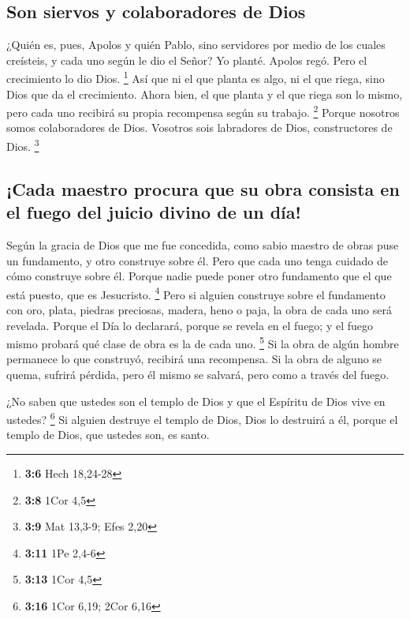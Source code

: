 \begin{paracol}{2}
\hypertarget{son-siervos-y-colaboradores-de-dios}{%
\subsection{Son siervos y colaboradores de
Dios}\label{son-siervos-y-colaboradores-de-dios}}

 ¿Quién es, pues, Apolos y quién Pablo, sino servidores
por medio de los cuales creísteis, y cada uno según le dio el Señor?
 Yo planté. Apolos regó. Pero el crecimiento lo dio Dios.
\footnote{\textbf{3:6} Hech 18,24-28}  Así que ni el que
planta es algo, ni el que riega, sino Dios que da el crecimiento.
 Ahora bien, el que planta y el que riega son lo mismo,
pero cada uno recibirá su propia recompensa según su trabajo.
\footnote{\textbf{3:8} 1Cor 4,5}  Porque nosotros somos
colaboradores de Dios. Vosotros sois labradores de Dios, constructores
de Dios. \footnote{\textbf{3:9} Mat 13,3-9; Efes 2,20}

\hypertarget{cada-maestro-procura-que-su-obra-consista-en-el-fuego-del-juicio-divino-de-un-duxeda}{%
\subsection{¡Cada maestro procura que su obra consista en el fuego del
juicio divino de un
día!}\label{cada-maestro-procura-que-su-obra-consista-en-el-fuego-del-juicio-divino-de-un-duxeda}}

 Según la gracia de Dios que me fue concedida, como sabio
maestro de obras puse un fundamento, y otro construye sobre él. Pero que
cada uno tenga cuidado de cómo construye sobre él. 
Porque nadie puede poner otro fundamento que el que está puesto, que es
Jesucristo. \footnote{\textbf{3:11} 1Pe 2,4-6}  Pero si
alguien construye sobre el fundamento con oro, plata, piedras preciosas,
madera, heno o paja,  la obra de cada uno será revelada.
Porque el Día lo declarará, porque se revela en el fuego; y el fuego
mismo probará qué clase de obra es la de cada uno. \footnote{\textbf{3:13}
  1Cor 4,5}  Si la obra de algún hombre permanece lo que
construyó, recibirá una recompensa.  Si la obra de alguno
se quema, sufrirá pérdida, pero él mismo se salvará, pero como a través
del fuego.

 ¿No saben que ustedes son el templo de Dios y que el
Espíritu de Dios vive en ustedes? \footnote{\textbf{3:16} 1Cor 6,19;
  2Cor 6,16}  Si alguien destruye el templo de Dios, Dios
lo destruirá a él, porque el templo de Dios, que ustedes son, es santo.


\end{paracol}
